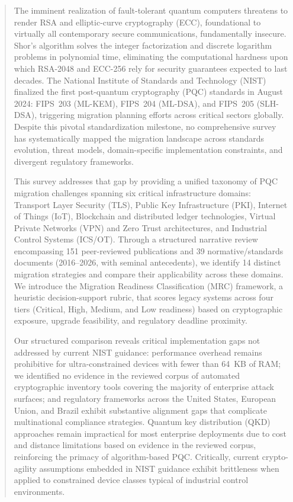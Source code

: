\documentclass[journal]{IEEEtran}
\begin{document}
\begin{abstract}
The imminent realization of fault-tolerant quantum computers threatens to render
RSA and elliptic-curve cryptography (ECC), foundational to virtually all
contemporary secure communications, fundamentally insecure. Shor's algorithm
solves the integer factorization and discrete logarithm problems in polynomial
time, eliminating the computational hardness upon which RSA-2048 and ECC-256
rely for security guarantees expected to last decades. The National Institute of
Standards and Technology (NIST) finalized the first post-quantum cryptography
(PQC) standards in August 2024: FIPS~203 (ML-KEM), FIPS~204 (ML-DSA), and
FIPS~205 (SLH-DSA), triggering migration planning efforts across critical
sectors globally. Despite this pivotal standardization milestone, no
comprehensive survey has systematically mapped the migration landscape across
standards evolution, threat models, domain-specific implementation constraints,
and divergent regulatory frameworks.

This survey addresses that gap by providing a unified taxonomy of PQC
migration challenges spanning six critical infrastructure domains: Transport
Layer Security (TLS), Public Key Infrastructure (PKI), Internet of Things (IoT),
Blockchain and distributed ledger technologies, Virtual Private Networks (VPN)
and Zero Trust architectures, and Industrial Control Systems (ICS/OT). Through
a structured narrative review encompassing 151 peer-reviewed
publications and 39 normative/standards documents (2016--2026, with seminal
antecedents), we identify 14 distinct migration strategies and compare their
applicability across these domains. We introduce the Migration
Readiness Classification (MRC) framework, a heuristic decision-support rubric,
that scores legacy systems across four tiers
(Critical, High, Medium, and Low readiness) based on cryptographic exposure,
upgrade feasibility, and regulatory deadline proximity.

Our structured comparison reveals critical implementation gaps not addressed by
current NIST guidance: performance overhead remains prohibitive for ultra-constrained
devices with fewer than 64~KB of RAM; we identified no evidence in the reviewed
corpus of automated cryptographic inventory tools covering the majority of
enterprise attack surfaces; and regulatory frameworks
across the United States, European Union, and Brazil exhibit substantive alignment
gaps that complicate multinational compliance strategies. Quantum key distribution
(QKD) approaches remain impractical for most enterprise deployments due to cost
and distance limitations based on evidence in the reviewed corpus,
reinforcing the primacy of algorithm-based PQC.
Critically, current crypto-agility assumptions embedded in NIST guidance exhibit
brittleness when applied to constrained device classes typical of industrial
control environments.


\end{abstract}
\end{document}
